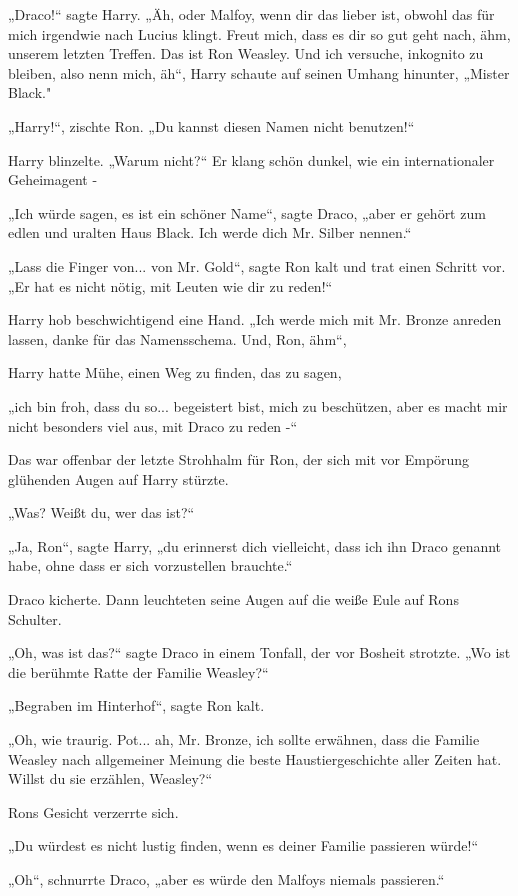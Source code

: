 {„Draco!“ sagte Harry. „Äh, oder Malfoy, wenn dir das lieber ist, obwohl das für mich irgendwie nach Lucius klingt. Freut mich, dass es dir so gut geht nach, ähm, unserem letzten Treffen. Das ist Ron Weasley. Und ich versuche, inkognito zu bleiben, also nenn mich, äh“, Harry schaute auf seinen Umhang hinunter, „Mister Black."

„Harry!“, zischte Ron. „Du kannst diesen Namen nicht benutzen!“

Harry blinzelte. „Warum nicht?“ Er klang schön dunkel, wie ein internationaler Geheimagent -

„Ich würde sagen, es ist ein schöner Name“, sagte Draco, „aber er gehört zum edlen und uralten Haus Black. Ich werde dich Mr. Silber nennen.“

„Lass die Finger von... von Mr. Gold“, sagte Ron kalt und trat einen Schritt vor. „Er hat es nicht nötig, mit Leuten wie dir zu reden!“

Harry hob beschwichtigend eine Hand. „Ich werde mich mit Mr. Bronze anreden lassen, danke für das Namensschema. Und, Ron, ähm“,

Harry hatte Mühe, einen Weg zu finden, das zu sagen,

„ich bin froh, dass du so... begeistert bist, mich zu beschützen, aber es macht mir nicht besonders viel aus, mit Draco zu reden -“

Das war offenbar der letzte Strohhalm für Ron, der sich mit vor Empörung glühenden Augen auf Harry stürzte.

„Was? Weißt du, wer das ist?“

„Ja, Ron“, sagte Harry, „du erinnerst dich vielleicht, dass ich ihn Draco genannt habe, ohne dass er sich vorzustellen brauchte.“

Draco kicherte. Dann leuchteten seine Augen auf die weiße Eule auf Rons Schulter.

„Oh, was ist das?“ sagte Draco in einem Tonfall, der vor Bosheit strotzte. „Wo ist die berühmte Ratte der Familie Weasley?“

„Begraben im Hinterhof“, sagte Ron kalt.

„Oh, wie traurig. Pot... ah, Mr. Bronze, ich sollte erwähnen, dass die Familie Weasley nach allgemeiner Meinung die beste Haustiergeschichte aller Zeiten hat. Willst du sie erzählen, Weasley?“

Rons Gesicht verzerrte sich.

„Du würdest es nicht lustig finden, wenn es deiner Familie passieren würde!“

„Oh“, schnurrte Draco, „aber es würde den Malfoys niemals passieren.“

}

